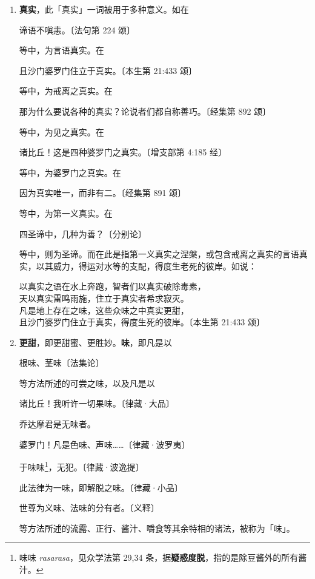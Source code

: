 \begin{enumerate}
\item \textbf{真实}，此「真实」一词被用于多种意义。如在\begin{quoting}谛语不嗔恚。{\bluefootnotesize 〔法句第 224 颂〕}\end{quoting}等中，为言语真实。在\begin{quoting}且沙门婆罗门住立于真实。{\bluefootnotesize 〔本生第 21:433 颂〕}\end{quoting}等中，为戒离之真实。在\begin{quoting}那为什么要说各种的真实？论说者们都自称善巧。{\bluefootnotesize 〔经集第 892 颂〕}\end{quoting}等中，为见之真实。在\begin{quoting}诸比丘！这是四种婆罗门之真实。{\bluefootnotesize 〔增支部第 4:185 经〕}\end{quoting}等中，为婆罗门之真实。在\begin{quoting}因为真实唯一，而非有二。{\bluefootnotesize 〔经集第 891 颂〕}\end{quoting}等中，为第一义真实。在\begin{quoting}四圣谛中，几种为善？{\bluefootnotesize 〔分别论〕}\end{quoting}等中，则为圣谛。而在此是指第一义真实之涅槃，或包含戒离之真实的言语真实，以其威力，得运对水等的支配，得度生老死的彼岸。如说：\begin{quoting}以真实之语在水上奔跑，智者们以真实破除毒素，\\天以真实雷鸣雨施，住立于真实者希求寂灭。\\凡是地上存在之味，这些众味之中真实更甜，\\且沙门婆罗门住立于真实，得度生死的彼岸。{\bluefootnotesize 〔本生第 21:433 颂〕}\end{quoting}
\item \textbf{更甜}，即更甜蜜、更胜妙。\textbf{味}，即凡是以\begin{quoting}根味、茎味{\bluefootnotesize 〔法集论〕}\end{quoting}等方法所述的可尝之味，以及凡是以\begin{quoting}诸比丘！我听许一切果味。{\bluefootnotesize 〔律藏·大品〕}\end{quoting}\begin{quoting}乔达摩君是无味者。\end{quoting}\begin{quoting}婆罗门！凡是色味、声味……{\bluefootnotesize 〔律藏·波罗夷〕}\end{quoting}\begin{quoting}于味味\footnote{味味 \textit{rasarasa}，见众学法第 29,34 条，据\textbf{疑惑度脱}，指的是除豆酱外的所有酱汁。}，无犯。{\bluefootnotesize 〔律藏·波逸提〕}\end{quoting}\begin{quoting}此法律为一味，即解脱之味。{\bluefootnotesize 〔律藏·小品〕}\end{quoting}\begin{quoting}世尊为义味、法味的分有者。{\bluefootnotesize 〔义释〕}\end{quoting}等方法所述的流露、正行、酱汁、嚼食等其余特相的诸法，被称为「味」。

\end{enumerate}
